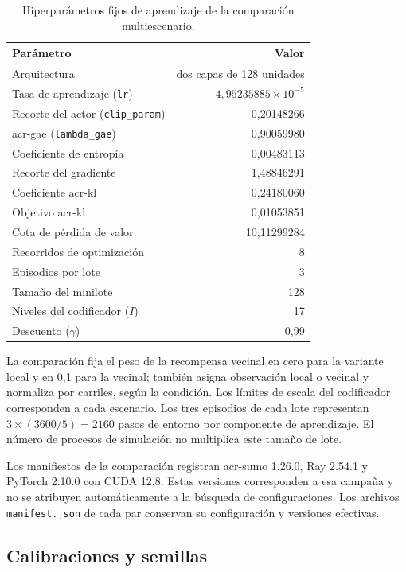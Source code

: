 \begin{table}[H]\centering\small
\caption[Hiperparámetros fijos de aprendizaje de MAPPO.]{Hiperparámetros fijos de aprendizaje de la comparación multiescenario.}\label{tab:receta_ac}
\begin{tabular}{>{\raggedright\arraybackslash}p{7cm}r}\hline
\rowcolor{catAzulCielo!25}
Parámetro & Valor \\\hline
Arquitectura & dos capas de 128 unidades \\
Tasa de aprendizaje (\texttt{lr}) & $4,95235885\times10^{-5}$ \\
Recorte del actor (\texttt{clip\_param}) & 0,20148266 \\
\acrshort{acr-gae} (\texttt{lambda\_gae}) & 0,90059980 \\
Coeficiente de entropía & 0,00483113 \\
Recorte del gradiente & 1,48846291 \\
Coeficiente \acrshort{acr-kl} & 0,24180060 \\
Objetivo \acrshort{acr-kl} & 0,01053851 \\
Cota de pérdida de valor & 10,11299284 \\
Recorridos de optimización & 8 \\
Episodios por lote & 3 \\
Tamaño del minilote & 128 \\
Niveles del codificador ($I$) & 17 \\
Descuento ($\gamma$) & 0,99 \\\hline
\end{tabular}\end{table}

La comparación fija el peso de la recompensa vecinal en cero para la variante local y en 0,1 para la vecinal; también asigna observación local o vecinal y normaliza por carriles, según la condición. Los límites de escala del codificador corresponden a cada escenario. Los tres episodios de cada lote representan $3\times(3600/5)=2160$ pasos de entorno por componente de aprendizaje. El número de procesos de simulación no multiplica este tamaño de lote.

Los manifiestos de la comparación registran \acrshort{acr-sumo} 1.26.0, Ray 2.54.1 y PyTorch 2.10.0 con CUDA 12.8. Estas versiones corresponden a esa campaña y no se atribuyen automáticamente a la búsqueda de configuraciones. Los archivos \texttt{manifest.json} de cada par conservan su configuración y versiones efectivas.

\subsection{Calibraciones y semillas}
\label{subsec:calibraciones_cooperacion}

